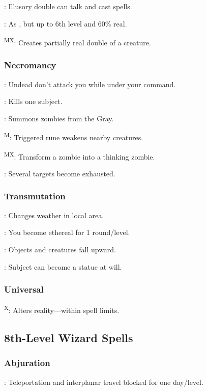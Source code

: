 	: Illusory double can talk and cast spells.

	: As , but up to 6th level and 60\% real.

	\textsuperscript{MX}: Creates partially real double of a creature.

\subsubsection{Necromancy}
	: Undead don't attack you while under your command.
	
	: Kills one subject.
	
	: Summons zombies from the Gray. %

	\textsuperscript{M}: Triggered rune weakens nearby creatures.

	\textsuperscript{MX}: Transform a zombie into a thinking 
	zombie. %
	
	: Several targets become exhausted.

\subsubsection{Transmutation}
	: Changes weather in local area.

	: You become ethereal for 1 round/level.

	: Objects and creatures fall upward.

	: Subject can become a statue at will.

\subsubsection{Universal}
	\textsuperscript{X}: Alters reality---within spell limits.



\subsection{8th-Level Wizard Spells}

\subsubsection{Abjuration}
	: Teleportation and interplanar travel blocked for one day/level.

